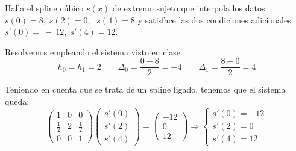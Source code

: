 \begin{ejercicio}
    Halla el spline cúbico $s(x)$ de extremo sujeto que interpola los datos $s(0) = 8,\;s(2) =0,\;$ $s(4) = 8$ y satisface las dos condiciones adicionales $s'(0)=~-~12, \;s'(4) = 12$.

    Resolvemos empleando el sistema visto en clase.
    \begin{equation*}
        h_0=h_1=2 \qquad \Delta_0=\frac{0-8}{2}=-4 \qquad \Delta_1=\frac{8-0}{2}=4
    \end{equation*}
    
    Teniendo en cuenta que se trata de un spline ligado, tenemos que el sistema queda:
    \begin{equation*}
        \left(\begin{array}{ccc}
            1 & 0 & 0 \\
            \frac{1}{2} & 2 & \frac{1}{2} \\
            0 & 0 & 1
        \end{array}\right)
        \left(\begin{array}{c}
            s'(0) \\ s'(2) \\ s'(4)
        \end{array}\right)
        = \left(\begin{array}{c}
            -12 \\ 0 \\ 12
        \end{array}\right) \Longrightarrow \left\{\begin{array}{l}
            s'(0)=-12 \\
            s'(2)=0 \\
            s'(4)=12
        \end{array}\right.
    \end{equation*}


\end{ejercicio}
